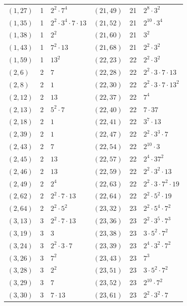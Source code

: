 \documentclass[11pt]{article}
\begin{document}
\begin{longtable}{@{}lrl@{\qquad}lrl@{}}
$(1,27)$ & 1 & $2^{2}\cdot 7^{4}$ & $(21,49)$ & 21 & $2^{8}\cdot 3^{2}$\\
$(1,35)$ & 1 & $2^{2}\cdot 3^{4}\cdot 7\cdot 13$ & $(21,52)$ & 21 & $2^{10}\cdot 3^{4}$\\
$(1,38)$ & 1 & $2^{2}$ & $(21,60)$ & 21 & $3^{2}$\\
$(1,43)$ & 1 & $7^{2}\cdot 13$ & $(21,68)$ & 21 & $2^{2}\cdot 3^{2}$\\
$(1,59)$ & 1 & $13^{2}$ & $(22,23)$ & 22 & $2^{2}\cdot 3^{2}$\\
$(2,6)$ & 2 & $7$ & $(22,28)$ & 22 & $2^{2}\cdot 3\cdot 7\cdot 13$\\
$(2,8)$ & 2 & $1$ & $(22,30)$ & 22 & $2^{2}\cdot 3\cdot 7\cdot 13^{2}$\\
$(2,12)$ & 2 & $13$ & $(22,37)$ & 22 & $7^{4}$\\
$(2,13)$ & 2 & $5^{2}\cdot 7$ & $(22,40)$ & 22 & $7\cdot 37$\\
$(2,18)$ & 2 & $1$ & $(22,41)$ & 22 & $3^{7}\cdot 13$\\
$(2,39)$ & 2 & $1$ & $(22,47)$ & 22 & $2^{2}\cdot 3^{3}\cdot 7$\\
$(2,43)$ & 2 & $7$ & $(22,54)$ & 22 & $2^{10}\cdot 3$\\
$(2,45)$ & 2 & $13$ & $(22,57)$ & 22 & $2^{4}\cdot 37^{2}$\\
$(2,46)$ & 2 & $13$ & $(22,59)$ & 22 & $2^{2}\cdot 3^{2}\cdot 13$\\
$(2,49)$ & 2 & $2^{4}$ & $(22,63)$ & 22 & $2^{2}\cdot 3\cdot 7^{2}\cdot 19$\\
$(2,62)$ & 2 & $2^{2}\cdot 7\cdot 13$ & $(22,64)$ & 22 & $2^{2}\cdot 5^{2}\cdot 19$\\
$(2,64)$ & 2 & $2^{2}\cdot 5^{2}$ & $(23,32)$ & 23 & $2^{2}\cdot 5^{4}\cdot 7^{2}$\\
$(3,13)$ & 3 & $2^{2}\cdot 7\cdot 13$ & $(23,36)$ & 23 & $2^{2}\cdot 3^{5}\cdot 7^{3}$\\
$(3,19)$ & 3 & $3$ & $(23,38)$ & 23 & $3\cdot 5^{2}\cdot 7^{2}$\\
$(3,24)$ & 3 & $2^{2}\cdot 3\cdot 7$ & $(23,39)$ & 23 & $2^{4}\cdot 3^{2}\cdot 7^{2}$\\
$(3,26)$ & 3 & $7^{2}$ & $(23,43)$ & 23 & $7^{3}$\\
$(3,28)$ & 3 & $2^{2}$ & $(23,51)$ & 23 & $3\cdot 5^{2}\cdot 7^{2}$\\
$(3,29)$ & 3 & $7$ & $(23,52)$ & 23 & $2^{10}\cdot 7^{2}$\\
$(3,30)$ & 3 & $7\cdot 13$ & $(23,61)$ & 23 & $2^{2}\cdot 3^{2}\cdot 7$\\

\end{longtable}
\end{document}
